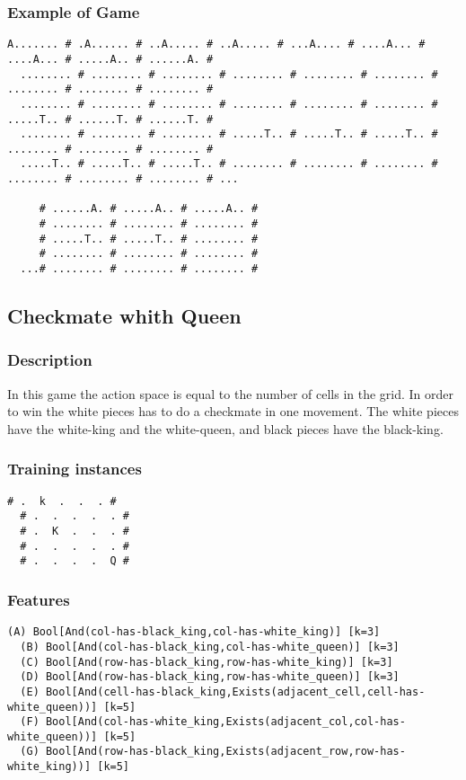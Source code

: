 \documentclass[a4paper]{article}
\begin{document}
\subsubsection{Example of Game}
\begin{Verbatim}[fontsize=\footnotesize]
  A....... # .A...... # ..A..... # ..A..... # ...A.... # ....A... # ....A... # .....A.. # ......A. #
  ........ # ........ # ........ # ........ # ........ # ........ # ........ # ........ # ........ #
  ........ # ........ # ........ # ........ # ........ # ........ # .....T.. # ......T. # ......T. #
  ........ # ........ # ........ # .....T.. # .....T.. # .....T.. # ........ # ........ # ........ #
  .....T.. # .....T.. # .....T.. # ........ # ........ # ........ # ........ # ........ # ........ # ...

     # ......A. # .....A.. # .....A.. #
     # ........ # ........ # ........ #
     # .....T.. # .....T.. # ........ #
     # ........ # ........ # ........ #
  ...# ........ # ........ # ........ #

\end{Verbatim}


\subsection{Checkmate whith Queen}
\subsubsection{Description}
In this game the action space is equal to the number of cells in the grid. In order to win the white pieces has to do a checkmate in one movement. The white pieces have the white-king and the white-queen, and black pieces have the black-king.

\subsubsection{Training instances}
\begin{Verbatim}[fontsize=\footnotesize]
  # .  k  .  .  . #
  # .  .  .  .  . #
  # .  K  .  .  . #
  # .  .  .  .  . #
  # .  .  .  .  Q #
\end{Verbatim}


\subsubsection{Features}
\begin{Verbatim}[fontsize=\footnotesize]
  (A) Bool[And(col-has-black_king,col-has-white_king)] [k=3]
  (B) Bool[And(col-has-black_king,col-has-white_queen)] [k=3]
  (C) Bool[And(row-has-black_king,row-has-white_king)] [k=3]
  (D) Bool[And(row-has-black_king,row-has-white_queen)] [k=3]
  (E) Bool[And(cell-has-black_king,Exists(adjacent_cell,cell-has-white_queen))] [k=5]
  (F) Bool[And(col-has-white_king,Exists(adjacent_col,col-has-white_queen))] [k=5]
  (G) Bool[And(row-has-black_king,Exists(adjacent_row,row-has-white_king))] [k=5]
\end{Verbatim}
\end{document}
